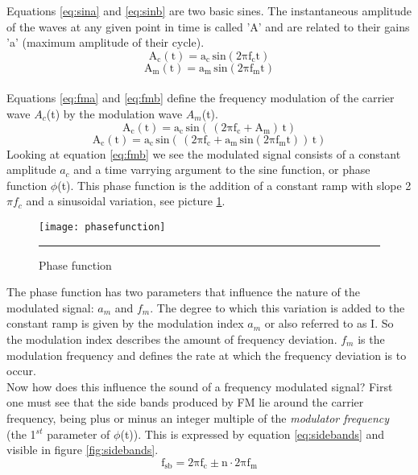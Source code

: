 Equations \ref{eq:sina} and \ref{eq:sinb} are two basic sines. The instantaneous amplitude of the waves at any given point in time is called 'A' and are related to their gains 'a' (maximum amplitude of their cycle).
\begin{equation}
\mathrm{A_{c}(t) = a_{c}\,sin(2\pi f_{c} t)}
\label{eq:sina}
\end{equation}
\begin{equation}
\mathrm{A_{m}(t) = a_{m}\,sin(2\pi f_{m} t)}
\label{eq:sinb}
\end{equation}\\
Equations \ref{eq:fma} and \ref{eq:fmb} define the frequency modulation of the carrier wave $A_{c}$(t) by the modulation wave $A_{m}$(t).
\begin{equation}
\mathrm{A_{c}(t) = a_{c}\,sin(\,(2\pi f_{c} + A_{m} )\, t)}
\label{eq:fma}
\end{equation}
\begin{equation}
\mathrm{A_{c}(t) = a_{c}\,sin(\,(2\pi f_{c} + a_{m}\,\mathrm{sin}(2\pi f_{m} t ))\, t)}
\label{eq:fmb}
\end{equation}
Looking at equation \ref{eq:fmb} we see the modulated signal consists of a constant amplitude $a_{c}$ and a time varrying argument to the sine function, or phase function $\phi$(t). This phase function is the addition of a constant ramp with slope 2 $\pi f_{c}$ and a sinusoidal variation, see picture \ref{fig:phasefunction}.
\begin{figure}[htbp]
\centering
\texttt{[image: phasefunction]}
\rule{30em}{0.5pt}
\caption{Phase function}
\label{fig:phasefunction}
\end{figure}
The phase function has two parameters that influence the nature of the modulated signal: $a_{m}$ and $f_{m}$. The degree to which this variation is added to the constant ramp is given by the modulation index $a_{m}$ or also referred to as I. So the modulation index describes the amount of frequency deviation. $f_{m}$ is the modulation frequency and defines the rate at which the frequency deviation is to occur.\\ Now how does this influence the sound of a frequency modulated signal? First one must see that the side bands produced by FM lie around the carrier frequency, being plus or minus an integer multiple of the \emph{modulator frequency} (the 1$^{st}$ parameter of $\phi$(t)). This is expressed by equation \ref{eq:sidebands} and visible in figure \ref{fig:sidebands}.
\begin{equation}
\mathrm{f_{sb} = 2\pi f_{c} \pm \mathrm{n} \cdot 2\pi f_{m} }
\label{eq:sidebands}
\end{equation}
